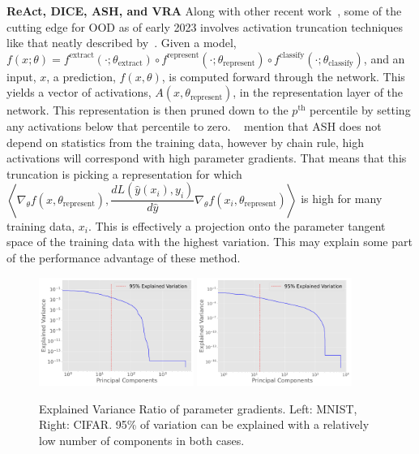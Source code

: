 \textbf{ReAct, DICE, ASH, and VRA}
Along with other recent work~\citep{sun2021, sun2022, xu2023vra}, some of the cutting edge for OOD as of early 2023 involves activation truncation techniques like that neatly described by~\citet{djurisic2023}. Given a model, $f(x; \theta) = f^{\text{extract}}(\cdot; \theta_{\text{extract}}) \circ f^{\text{represent}}(\cdot; \theta_{\text{represent}}) \circ f^{\text{classify}}(\cdot; \theta_{\text{classify}})$, and an input, $x$, a prediction, $f(x, \theta)$, is computed forward through the network. This yields a vector of activations, $A(x, \theta_{\text{represent}})$, in the representation layer of the network. This representation is then pruned down to the $p^{\text{th}}$ percentile by setting any activations below that percentile to zero. ~\citet{djurisic2023} mention that ASH does not depend on statistics from the training data, however by chain rule, high activations will correspond with high parameter gradients. That means that this truncation is picking a representation for which $\left\langle \nabla_\theta f(x, \theta_{\text{represent}}), \dfrac{dL(\hat y(x_i), y_i)}{d\hat y} \nabla_\theta f(x_i, \theta_{\text{represent}}) \right\rangle$ is high for many training data, $x_i$. This is effectively a projection onto the parameter tangent space of the training data with the highest variation. This may explain some part of the performance advantage of these method. 

\begin{figure}[t]
    \centering
    \includegraphics[width=0.45\textwidth]{c4a_figures/explained_variance_ratio.pdf}
    \includegraphics[width=0.45\textwidth]{c4a_figures/explained_variance_ratio_cifar.pdf}
    \caption{Explained Variance Ratio of parameter gradients. Left: MNIST, Right: CIFAR. 95\% of variation can be explained with a relatively low number of components in both cases.}
    \label{fig:rank}
\end{figure}

